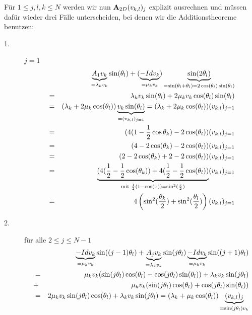 Für $1 \le j,l,k \le N$ werden wir nun ${\textbf{A}}_{2D} (v_{k,l})_{j}$ explizit ausrechnen und müssen dafür wieder drei Fälle unterscheiden, bei denen wir die Additionstheoreme benutzen:
\begin{description}
\item[1.] $j = 1$
\begin{eqnarray}
&&\underbrace{A_{1} v_{k}}_{=\lambda_{k} v_{k}} \sin(\theta_{l}) + (\underbrace{-Id v_{k}}_{= \mu_{k} v_{k}}) \underbrace{\sin(2\theta_{l})}_{= \sin(\theta_{l} + \theta_{l}) = 2\cos({\theta_{l})\sin({\theta_{l}})}} \notag \\
&=& \lambda_{k}v_{k}\sin(\theta_{l}) + 2\mu_{k}v_{k}\cos(\theta_{l})\sin(\theta_{l}) \notag \\
&=& (\lambda_{k} + 2\mu_{k}\cos(\theta_{l})) \underbrace{v_{k}\sin(\theta_{l})}_{= (v_{k,l})_{j=1}} = (\lambda_{k} + 2\mu_{k}\cos(\theta_{l}))(v_{k,l})_{j=1} \notag \\
&=& (4(1 - \frac{1}{2}\cos{\theta_{k}}) - 2\cos(\theta_{l})) (v_{k,l})_{j=1} \notag \\
&=& (4 - 2\cos(\theta_{k}) - 2\cos(\theta_{l})) (v_{k,l})_{j=1} \notag \\
&=& (2 - 2\cos(\theta_{k}) + 2 - 2\cos(\theta_{l})) (v_{k,l})_{j=1} \notag \\
&=& \underbrace{(4(\frac{1}{2} - \frac{1}{2}\cos(\theta_{k})) + 4(\frac{1}{2} - \frac{1}{2}\cos(\theta_{l}))}_{\textnormal{mit } \frac{1}{2}(1 - \cos(x)) = \sin^{2}(\frac{x}{2})} (v_{k,l})_{j=1} \notag \\
&=& 4 \left(\sin^{2}(\frac {\theta_{k}} {2}) + \sin^{2}(\frac {\theta_{l}} {2})\right) (v_{k,l})_{j=1}\notag
\end{eqnarray}
\item[2.] für alle $2 \le j \le N-1$
\begin{eqnarray}
&&\underbrace{-Id v_{k}}_{= \mu_{k} v_{k}} \sin((j-1) \theta_{l}) + \underbrace{A_{j} v_{k}}_{=\lambda_{k} v_{k}} \sin(j\theta_{l}) \underbrace{- Id v_{k}}_{= \mu_{k} v_{k}} \sin((j+1) \theta_{l}) \notag \\
&=& \mu_{k} v_{k} (\sin(j\theta_{l})\cos(\theta_{l}) - \cos(j\theta_{l})\sin(\theta_{l})) + \lambda_{k} v_{k} \sin(j\theta_{l}) \notag \\
&+& \mu_{k} v_{k} (\sin(j\theta_{l})\cos(\theta_{l}) + \cos(j\theta_{l})\sin(\theta_{l})) \notag \\
&=& 2 \mu_{k} v_{k} \sin(j\theta_{l})\cos(\theta_{l}) + \lambda_{k} v_{k} \sin(j\theta_{l}) = (\lambda_{k} + \mu_{k} \cos(\theta_{l})) \underbrace{(v_{k,l})_{j}}_{= \sin(j\theta_{l}) v_{k}} \notag \\

\end{eqnarray}
\end{description}
